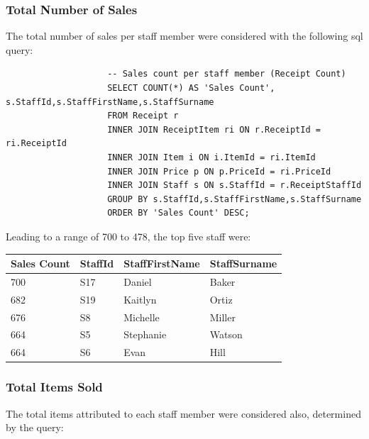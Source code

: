 \documentclass{article}
\begin{document}
            \subsubsection{Total Number of Sales}
                The total number of sales per staff member were considered with the following 
                sql query:
                \begin{lstlisting}
                    -- Sales count per staff member (Receipt Count)
                    SELECT COUNT(*) AS 'Sales Count', s.StaffId,s.StaffFirstName,s.StaffSurname
                    FROM Receipt r
                    INNER JOIN ReceiptItem ri ON r.ReceiptId = ri.ReceiptId
                    INNER JOIN Item i ON i.ItemId = ri.ItemId
                    INNER JOIN Price p ON p.PriceId = ri.PriceId
                    INNER JOIN Staff s ON s.StaffId = r.ReceiptStaffId
                    GROUP BY s.StaffId,s.StaffFirstName,s.StaffSurname
                    ORDER BY 'Sales Count' DESC;
                \end{lstlisting}

                Leading to a range of 700 to 478, the top five staff were:

                \begin{table}[H]
                    \centering
                    \begin{tabular}{|l|l|l|l|}
                    \hline
                    Sales Count & StaffId & StaffFirstName & StaffSurname \\ \hline
                    700         & S17     & Daniel         & Baker        \\ \hline
                    682         & S19     & Kaitlyn        & Ortiz        \\ \hline
                    676         & S8      & Michelle       & Miller       \\ \hline
                    664         & S5      & Stephanie      & Watson       \\ \hline
                    664         & S6      & Evan           & Hill         \\ \hline
                    \end{tabular}
                    \end{table}

            \subsubsection{Total Items Sold}
                The total items attributed to each staff member were considered also,
                determined by the query:
                
\end{document}
